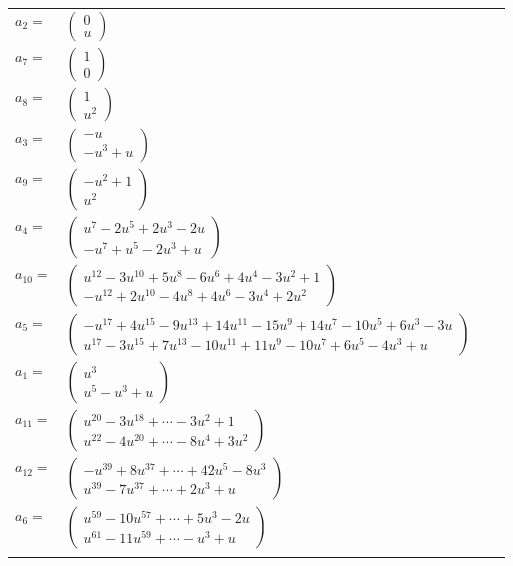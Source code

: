 \documentclass[1p]{elsarticle_modified}
\theoremstyle{definition}
\begin{document}
\begin{tabular}{m{7pt} m{180pt} m{7pt} m{180pt} }
\flushright $a_{2}=$&$\begin{pmatrix}0\\u\end{pmatrix}$ \\
\flushright $a_{7}=$&$\begin{pmatrix}1\\0\end{pmatrix}$ \\
\flushright $a_{8}=$&$\begin{pmatrix}1\\u^2\end{pmatrix}$ \\
\flushright $a_{3}=$&$\begin{pmatrix}- u\\- u^3+u\end{pmatrix}$ \\
\flushright $a_{9}=$&$\begin{pmatrix}- u^2+1\\u^2\end{pmatrix}$ \\
\flushright $a_{4}=$&$\begin{pmatrix}u^7-2 u^5+2 u^3-2 u\\- u^7+u^5-2 u^3+u\end{pmatrix}$ \\
\flushright $a_{10}=$&$\begin{pmatrix}u^{12}-3 u^{10}+5 u^8-6 u^6+4 u^4-3 u^2+1\\- u^{12}+2 u^{10}-4 u^8+4 u^6-3 u^4+2 u^2\end{pmatrix}$ \\
\flushright $a_{5}=$&$\begin{pmatrix}- u^{17}+4 u^{15}-9 u^{13}+14 u^{11}-15 u^9+14 u^7-10 u^5+6 u^3-3 u\\u^{17}-3 u^{15}+7 u^{13}-10 u^{11}+11 u^9-10 u^7+6 u^5-4 u^3+u\end{pmatrix}$ \\
\flushright $a_{1}=$&$\begin{pmatrix}u^3\\u^5- u^3+u\end{pmatrix}$ \\
\flushright $a_{11}=$&$\begin{pmatrix}u^{20}-3 u^{18}+\cdots-3 u^2+1\\u^{22}-4 u^{20}+\cdots-8 u^4+3 u^2\end{pmatrix}$ \\
\flushright $a_{12}=$&$\begin{pmatrix}- u^{39}+8 u^{37}+\cdots+42 u^5-8 u^3\\u^{39}-7 u^{37}+\cdots+2 u^3+u\end{pmatrix}$ \\
\flushright $a_{6}=$&$\begin{pmatrix}u^{59}-10 u^{57}+\cdots+5 u^3-2 u\\u^{61}-11 u^{59}+\cdots- u^3+u\end{pmatrix}$\\&\end{tabular}
\end{document}
